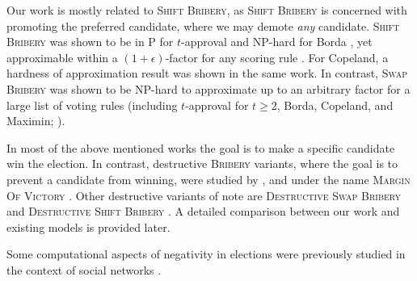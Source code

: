 \documentclass[letterpaper]{article} %
\newcommand{\Bribery}{\textsc{Bribery}}
\newcommand{\swapB}{\textsc{Swap Bribery}}
\newcommand{\shiftB}{\textsc{Shift Bribery}}
\newcommand{\DshiftB}{\textsc{Destructive} \shiftB{}}
\newcommand{\NP}{\mathrm{NP}}
\newcommand{\Pclass}{\mathrm{P}}
\begin{document}
Our work is mostly related to \shiftB{}, as \shiftB{} is concerned with promoting the preferred candidate, where we may demote \emph{any} candidate. \shiftB{} was shown to be in $\Pclass$ for $t$-approval and $\NP$-hard for Borda  \cite{DBLP:conf/sagt/ElkindFS09}, yet approximable within a $(1+\epsilon)$-factor for any scoring rule \cite{DBLP:conf/aaai/FaliszewskiMS19}. For Copeland, a hardness of approximation result was shown in the same work.
In contrast, \swapB{} was shown to be $\NP$-hard to approximate up to an arbitrary factor for a large list of voting rules (including $t$-approval for $t \geq 2$, Borda, Copeland, and Maximin; \citealt{elkind2010approximation}).

In most of the above mentioned works the goal is to make a specific candidate win the election. In contrast, destructive \textsc{Bribery} variants, where the goal is to prevent a candidate from winning, were studied by \citet*{DBLP:journals/jair/FaliszewskiHHR09}, and under the name \textsc{Margin Of Victory}  \cite{magrino2011computing,cary2011estimating,xia2012computing,dey2015estimating}.
Other destructive variants of note are
\textsc{Destructive Swap Bribery} \cite{shiryaev2013elections} and \DshiftB{} \cite{Kaczmarczyk2019destructive}. A detailed comparison between our work and existing models is provided later.

Some computational aspects of negativity in elections were previously  studied  in the context of social networks  \cite{DBLP:conf/ictcs/MehriziCCDP19,DBLP:conf/aaai/CastiglioniF020}.



\end{document}
